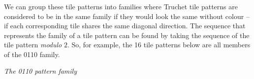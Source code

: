 \documentclass{tufte-book}
\begin{document}
\vspace{0.5cm}
\noindent
We can group these tile patterns into families where Truchet tile patterns are considered to be in the same family if they would look the same without colour -- if each corresponding tile shares the same diagonal direction. The sequence that represents the family of a tile pattern can be found by taking the sequence of the tile pattern \textit{modulo} $2$. So, for example, the 16 tile patterns below are all members of the 0110 family. 

\vspace{0.5cm}



{\begin{center} \textit{The 0110 pattern family}\end{center}}


\mainmatter



\backmatter
\nocite{*}


\end{document}
